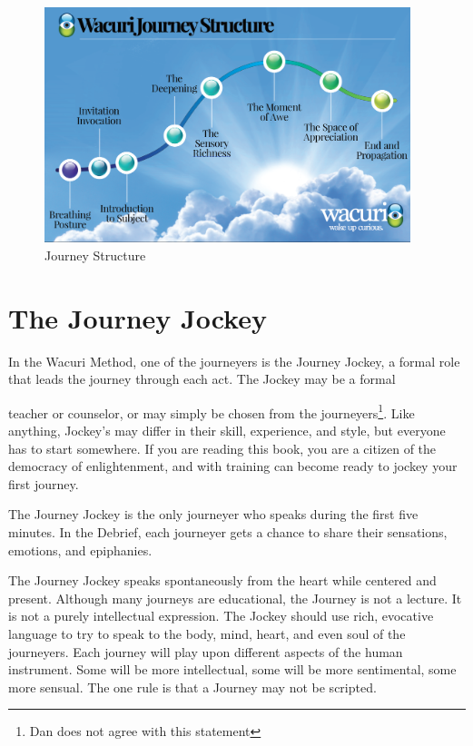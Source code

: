 \documentclass[12pt]{book}
\begin{document}
\begin{figure}
  \centering
     \includegraphics[width=0.95\textwidth]{WacuriFigures/Wacuri-Journey-Structure-Compressed.png}
     \caption{Journey Structure}
  \label{fig:journey2}     
\end{figure}



\section{The Journey Jockey}

In the Wacuri Method, one of the journeyers is the Journey Jockey, a
formal role that leads the journey through each act. The Jockey may be
a formal
					
teacher or counselor, or may simply be chosen from the
journeyers\footnote{Dan does not agree with this statement}. Like
anything, Jockey’s may differ in their skill, experience, and style,
but everyone has to start somewhere. If you are reading this book, you
are a citizen of the democracy of enlightenment, and with training can
become ready to jockey your first journey.
					
The Journey Jockey is the only journeyer who speaks during the first
five minutes. In the Debrief, each journeyer gets a chance to share
their sensations, emotions, and epiphanies.
					
The Journey Jockey speaks spontaneously from the heart while centered
and present.   Although many journeys are
educational, the Journey is not a lecture. It is not a purely
intellectual expression. The Jockey should use rich, evocative
language to try to speak to the body, mind, heart, and even soul of
the journeyers. Each journey will play upon different aspects of the
human instrument. Some will be more intellectual, some will be more
sentimental, some more sensual. The one rule is that a Journey may not
be scripted.
					
\end{document}
